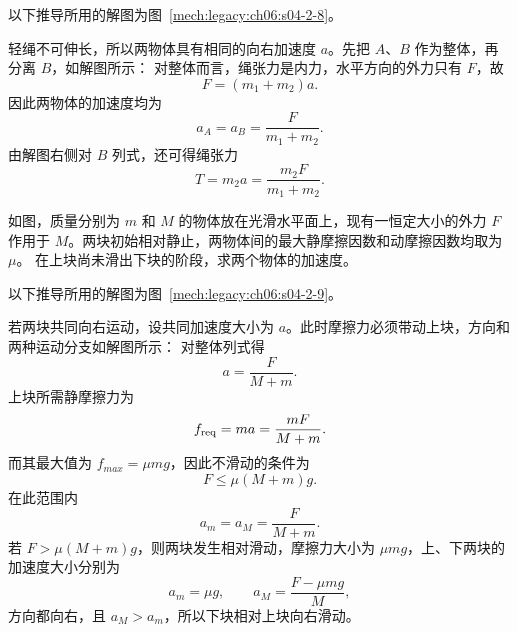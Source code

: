 {\begin{xesolution}
以下推导所用的解图为图~\ref{mech:legacy:ch06:s04-2-8}。

轻绳不可伸长，所以两物体具有相同的向右加速度 $a$。先把 $A$、$B$ 作为整体，再分离 $B$，如解图所示：
\soldiagTwoEight
对整体而言，绳张力是内力，水平方向的外力只有 $F$，故
\[
  F=(m_1+m_2)a.
\]
因此两物体的加速度均为
\[
  \boxed{a_A=a_B=\frac{F}{m_1+m_2}}.
\]
由解图右侧对 $B$ 列式，还可得绳张力
\[
  T=m_2a=\frac{m_2F}{m_1+m_2}.
\]
\end{xesolution}

\begin{origexamplebox}{}\label{ch06:ex:s04-2-9}
如图，质量分别为 $m$ 和 $M$ 的物体放在光滑水平面上，现有一恒定大小的外力 $F$ 作用于
$M$。两块初始相对静止，两物体间的最大静摩擦因数和动摩擦因数均取为 $\mu$。
在上块尚未滑出下块的阶段，求两个物体的加速度。

\begin{center}\begin{minipage}{\linewidth}\centering
{}
\end{minipage}\end{center}
\label{ch06:fig:s04-2-9}
\end{origexamplebox}

\begin{xesolution}
以下推导所用的解图为图~\ref{mech:legacy:ch06:s04-2-9}。

若两块共同向右运动，设共同加速度大小为 $a$。此时摩擦力必须带动上块，方向和两种运动分支如解图所示：
\soldiagTwoNine
对整体列式得
\[
  a=\frac{F}{M+m}.
\]
上块所需静摩擦力为
\[
  f_{\rm req}=ma=\frac{mF}{M+m}.
\]
而其最大值为 $f_{max}=\mu mg$，因此不滑动的条件为
\[
  \boxed{F\le\mu(M+m)g}.
\]
在此范围内
\[
  \boxed{a_m=a_M=\frac{F}{M+m}}.
\]
若 $F>\mu(M+m)g$，则两块发生相对滑动，摩擦力大小为 $\mu mg$，上、下两块的加速度大小分别为
\[
  \boxed{a_m=\mu g},
  \qquad
  \boxed{a_M=\frac{F-\mu mg}{M}},
\]
方向都向右，且 $a_M>a_m$，所以下块相对上块向右滑动。
\end{xesolution}

}
